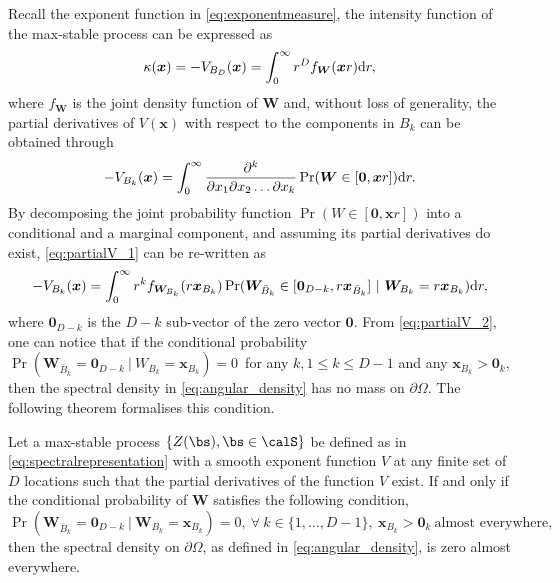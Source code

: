 \documentclass[12pt]{article}
\begin{document}
%
Recall the exponent function in \eqref{eq:exponentmeasure}, the intensity function of the max-stable process can be expressed as 
\begin{equation}\label{eq:intensity}
	\kappa(\bm x) = -V_{B_D}(\bm x) = \int_0^\infty r^D f_{\bm W}(\bm xr)\text dr,
\end{equation} 
where $f_{\bm W}$ is the joint density function of $\bm W$ and, without loss of generality, the partial derivatives of $V(\bm x)$ with respect to the components in $B_k$ can be obtained through
%
\begin{equation}
\label{eq:partialV_1}
 -V_{B_k}(\bm x) = \int_0^\infty \frac{\partial^k}{\partial x_1\partial x_2\dots \partial x_k}\Pr(\bm W \in [\bm 0,\bm xr ])\text dr. 
\end{equation}
%
By decomposing the joint probability function $\Pr(W\in [\bm 0,\bm xr])$ into a conditional and a marginal component, and assuming its partial derivatives do exist, \eqref{eq:partialV_1} can be re-written as
%
\begin{equation}
\label{eq:partialV_2}
 -V_{B_k}(\bm x) = \int_0^\infty r^k f_{\bm W_{B_k}}(r \bm x_{B_k})  \Pr(\bm W_{\bar{B}_k} \in [\bm 0_{D-k},r \bm x_{\bar{B}_k} ]\ |\ \bm W_{B_k} = r \bm x_{B_k} )\text dr,
\end{equation}
%
where $\bm 0_{D-k}$ is the $D-k$ sub-vector of the zero vector $\bm 0$.
From \eqref{eq:partialV_2}, one can notice that if the conditional probability $\Pr(\bm W_{\bar{B}_k} =\bm 0_{D-k}\ |\ W_{B_k} = \bm x_{B_k} )=0$\ for any $k, 1 \leq k \leq D-1$ and any $\bm x_{B_k} > \bm 0_k$, then the spectral density in \eqref{eq:angular_density} has no mass on $\partial\Omega$. The following theorem formalises this condition. 
%
\begin{theorem}
\label{thm:augular_density}
Let a max-stable process $\{Z(\bs), \bs\in \calS\}$ be defined as in \eqref{eq:spectralrepresentation} with a smooth exponent function $V$ at any finite set of $D$ locations such that the partial derivatives of the function $V$ exist. If and only if the conditional probability of $\bm W$ satisfies the following condition, 
%
\begin{equation}
\label{eq:thm_angular_density}
\Pr(\bm W_{\bar{B}_k}=\bm 0_{D-k} \ |\ \bm W_{B_k} = \bm x_{B_k} )=0,\ \forall\ k \in \{1,\ldots,D-1\},\ \bm x_{B_k}>\bm 0_k \ \text{almost everywhere, }
\end{equation}
%
then the spectral density on $\partial\Omega$, as defined in \eqref{eq:angular_density}, is zero almost everywhere.  
\end{theorem}
\end{document}
